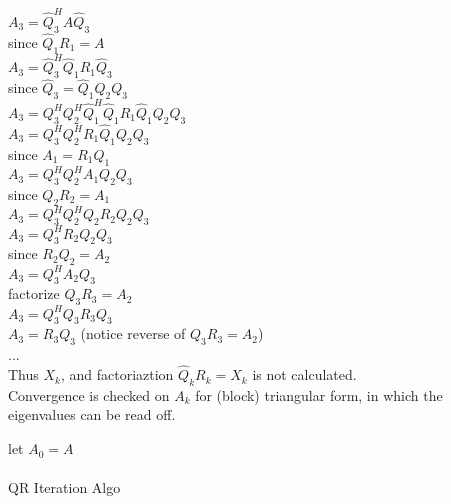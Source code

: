\documentclass[8pt,letter]{article}
\begin{document}
\begin{multicols*}{2}
    $A_3 = \hat{Q}_3^H A \hat{Q}_3$\\
    since $\hat{Q}_1 R_1 = A$\\
    $A_3 = \hat{Q}_3^H \hat{Q}_1 R_1 \hat{Q}_3$\\
    since $\hat{Q}_3 = \hat{Q}_1 Q_2 Q_3$\\
    $A_3 = Q_3^H Q_2^H \hat{Q}_1^H \hat{Q}_1 R_1 \hat{Q}_1 Q_2 Q_3$\\
    $A_3 = Q_3^H Q_2^H  R_1 \hat{Q}_1 Q_2 Q_3$\\
    since $A_1 = R_1 \hat{Q}_1$\\
    $A_3 = Q_3^H Q_2^H  A_1 Q_2 Q_3$\\
    since $Q_2 R_2 = A_1$\\
    $A_3 = Q_3^H Q_2^H Q_2 R_2 Q_2 Q_3$\\
    $A_3 = Q_3^H R_2 Q_2 Q_3$\\
    since $R_2 Q_2 = A_2$\\
    $A_3 = Q_3^H A_2 Q_3$\\
    factorize $Q_3 R_3 = A_2$\\
    $A_3 = Q_3^H Q_3 R_3 Q_3$\\
    $A_3 = R_3 Q_3$ (notice reverse of $Q_3 R_3 = A_2$)\\
    ...\\

    Thus $X_k$, and factoriaztion $\hat{Q}_k R_k = X_k$ is not calculated.\\
    Convergence is checked on $A_k$ for (block) triangular form, in which the eigenvalues can be read off.\\
    
    \begin{algorithm}[H]
      let $A_0 = A$\\
      \\
      \caption{QR Iteration Algo \label{Algo_QR_iteration}}
    \end{algorithm}
        
\end{multicols*}
\end{document}
